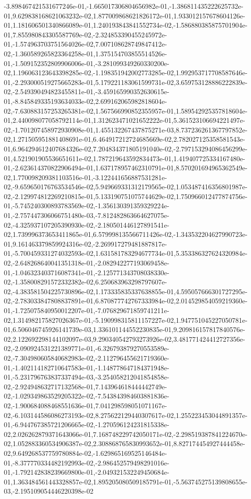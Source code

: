 -3.898467421531677246e-01,-1.665017306804656982e-01,-1.386811435222625732e-01,9.629838168621063232e-02,1.877009868621826172e-01,1.933012157678604126e-01,1.181606501340866089e-01,1.240193843841552734e-02,-1.586880385875701904e-01,7.855980843305587769e-02,-2.324853390455245972e-01,-1.574963703751564026e-02,7.007108628749847412e-02,-1.360589265823364258e-01,1.375154703855514526e-01,-1.509152352809906006e-01,-3.281099349260330200e-02,1.196063123643398285e-02,-1.198351942002773285e-02,1.992953717708587646e-01,-2.293000519275665283e-01,5.179221183061599731e-02,3.659753128886222839e-02,-2.549390494823455811e-01,-3.459165990352630615e-01,-8.845849335193634033e-02,2.699162065982818604e-02,-7.630883157253265381e-02,1.567566990852355957e-01,1.589542925357818604e-01,2.440098077058792114e-01,1.312623471021652222e-01,5.361523106694221497e-02,-1.701207458972930908e-01,1.455132267437875271e-03,8.737236261367797852e-02,1.271505951881408691e-01,6.464917212724685669e-02,2.782027125358581543e-01,6.964294612407684326e-02,7.204834371805191040e-02,-2.797153294086456299e-01,4.521901905536651611e-02,1.787219643592834473e-01,1.419407725334167480e-01,-2.623614370822906494e-01,1.637178957462310791e-01,8.570201694965362549e-02,1.770098209381103516e-01,-3.122441656887531281e-02,-9.659650176763534546e-02,5.949669331312179565e-02,1.053487416356801987e-02,-2.129974812269210815e-01,5.133190751075744629e-02,1.750966012477874756e-01,-5.745240300893783569e-02,-1.356130391359329224e-01,-2.757447306066751480e-03,-7.812482863664627075e-02,-4.325937107205390930e-02,-2.180501446127891541e-02,1.739996373653411865e-01,6.579998135566711426e-02,-1.343532204627990723e-01,9.161463379859924316e-02,-2.269917279481887817e-01,-5.700459331274032593e-02,1.631581783294677734e-01,5.353386327624320984e-02,-2.648268640041351318e-01,-2.082942277193069458e-01,-1.046323403716087341e-01,-2.125771343708038330e-02,-1.358008291572332382e-02,6.250683963298797607e-02,-4.383581504225730896e-02,1.173335835337638855e-01,4.595057666301727295e-02,-2.783033847808837891e-01,6.870877742767333984e-02,2.014529854059219360e-01,-1.725075840950012207e-01,-7.076829671859741211e-02,1.314982175827026367e-01,-5.190998315811157227e-02,1.947751045227050781e-01,6.506046745926141739e-03,1.336101144552230835e-01,9.209816157817840576e-02,2.122692298144102097e-03,9.290340542793273926e-02,3.481771424412727356e-02,-2.090924531221389771e-01,-6.326793879270553589e-02,-7.304980605840682983e-02,-2.112796455621719360e-01,-1.402114182710647583e-01,-1.148778647184371948e-01,-5.231796763837337494e-03,-3.254058212041854858e-02,-2.924948632717132568e-01,7.143964618444442749e-02,-1.029349863529205322e-02,-7.543843984603881836e-02,-1.900684088468551636e-01,7.041298598051071167e-02,-6.103144586086273193e-02,8.275622129440307617e-02,1.255223453044891357e-01,-6.944767385721206665e-02,-1.270596124231815338e-02,2.026262879371643066e-01,7.168748229742050171e-02,-2.298519387841224670e-02,1.052883360534906387e-02,2.308868765830993652e-01,8.827174454927444458e-02,9.649268537759780884e-02,-1.629865169525146484e-01,-8.377770334482192993e-02,-2.986452579498291016e-01,-1.792142838239669800e-01,-2.049321532249450684e-01,1.363484561443328857e-02,1.895205080509185791e-01,-5.563745275139808655e-03,-2.195109054446220398e-02
